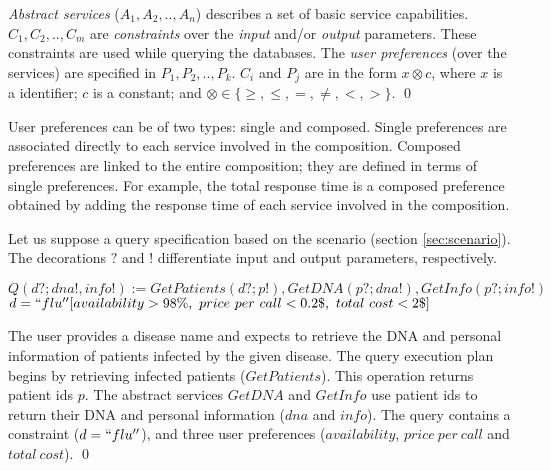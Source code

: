 \begin{definition}[queries]
\textit{Abstract services} ($A_{1}, A_{2}, .., A_{n}$) describes a set of basic service capabilities.
%
$C_{1}, C_{2}, .., C_{m}$ are \textit{constraints} over the \textit{input} and/or \textit{output} parameters. These constraints are used while querying the databases. 
The \textit{user preferences} (over the services) are specified in $P_{1}, P_{2}, .., P_{k}$.  
%
$C_{i}$ and $P_{j}$ are in the form $x \otimes c$, where $x$ is a identifier; $c$ is a constant; and
$\otimes \in\lbrace \geq, \leq, =, \neq, <, >\rbrace$.
%
\qed
\end{definition}

User preferences can be of two types: single and composed. Single preferences are associated directly to each service involved in the composition. Composed preferences are linked to the entire composition; they are defined in terms of single preferences. For example, the total response time is a composed preference obtained by adding the response time of each service involved in the composition. 

\begin{example}[query]
%
Let us suppose a query specification based on the scenario (section \ref{sec:scenario}). The decorations $?$ and $!$ differentiate input and output parameters, respectively. 
%
\begin{center}
\small
$Q(d?; dna!, info!) := GetPatients(d?; p!), GetDNA(p?; dna!), GetInfo(p?; info!)$
\\
$d = ``flu'' [availability > 98\%, \ price \ per \ call < 0.2\$, \ total \ cost < 2\$]$
\end{center}
%
The user provides a disease name and expects to retrieve the DNA and personal information of patients infected by the given disease. The query execution plan begins by retrieving infected patients ($GetPatients$). This operation returns patient ids $p$. The abstract services $GetDNA$ and $GetInfo$ use patient ids to return their DNA and personal information ($dna$ and $info$).
The query contains a constraint ($d = ``flu''$), and three user preferences ($availability$, $price \ per \ call$ and $total \ cost$).
\qed
\end{example}


